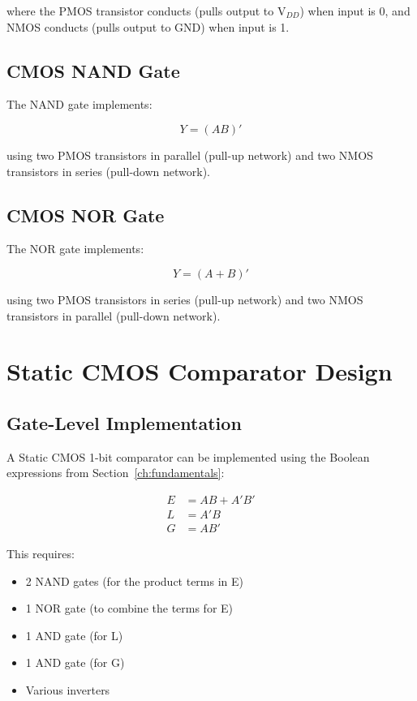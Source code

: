 \documentclass[12pt,a4paper,twoside]{report}
\begin{document}
where the PMOS transistor conducts (pulls output to V$_{DD}$) when input is 0, and NMOS conducts (pulls output to GND) when input is 1.

\subsection{CMOS NAND Gate}

The NAND gate implements:

\begin{equation}
Y = (AB)'
\end{equation}

using two PMOS transistors in parallel (pull-up network) and two NMOS transistors in series (pull-down network).

\subsection{CMOS NOR Gate}

The NOR gate implements:

\begin{equation}
Y = (A+B)'
\end{equation}

using two PMOS transistors in series (pull-up network) and two NMOS transistors in parallel (pull-down network).

\section{Static CMOS Comparator Design}

\subsection{Gate-Level Implementation}

A Static CMOS 1-bit comparator can be implemented using the Boolean expressions from Section~\ref{ch:fundamentals}:

\begin{align}
E &= AB + A'B' \\
L &= A'B \\
G &= AB'
\end{align}

This requires:
\begin{itemize}
    \item 2 NAND gates (for the product terms in E)
    \item 1 NOR gate (to combine the terms for E)
    \item 1 AND gate (for L)
    \item 1 AND gate (for G)
    \item Various inverters
\end{itemize}
\end{document}
